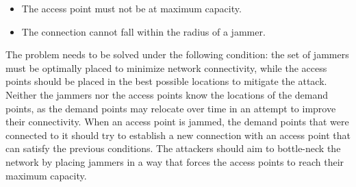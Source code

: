 \documentclass[runningheads]{llncs}
\begin{document}
\begin{itemize}
    \item The access point must not be at maximum capacity.
    \item The connection cannot fall within the radius of a jammer.
\end{itemize}

The problem needs to be solved under the following condition: the set of jammers must be optimally placed to minimize network connectivity, while the access points should be placed in the best possible locations to mitigate the attack. Neither the jammers nor the access points know the locations of the demand points, as the demand points may relocate over time in an attempt to improve their connectivity.
When an access point is jammed, the demand points that were connected to it should try to establish a new connection with an access point that can satisfy the previous conditions. The attackers should aim to bottle-neck the network by placing jammers in a way that forces the access points to reach their maximum capacity.
\end{document}
